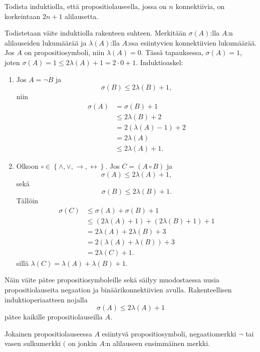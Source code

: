 \documentclass[12pt,a4paper]{article}
\begin{document}
\begin{exercise}
Todista induktiolla, että propositiolauseella, jossa on \(n\) konnektiivia,
on korkeintaan \(2n + 1\) alilausetta.
\end{exercise}

\begin{solution}
Todistetaan väite induktiolla rakenteen suhteen. Merkitään \(\sigma(A)\):lla
\(A\):n alilauseiden lukumäärää ja \(\lambda(A)\):lla \(A\):ssa esiintyvien
konnektiivien lukumäärää. Jos \(A\) on propositiosymboli, niin
\(\lambda(A) = 0\). Tässä tapauksessa, \(\sigma(A) = 1\), joten
\(\sigma(A) = 1 \leq 2\lambda(A) + 1 = 2\cdot 0 + 1\). Induktioaskel:
\begin{enumerate}[label=\alph*), nosep]
\item Jos \(A = \neg B\) ja
\[\sigma(B) \leq 2\lambda(B) + 1,\]
niin
\[
\begin{aligned}
\sigma(A) &= \sigma(B) + 1 \\
&\leq 2\lambda(B) + 2 \\
&= 2(\lambda(A) - 1) + 2 \\
&= 2\lambda(A) \\
&\leq 2\lambda(A) + 1.
\end{aligned}
\]
\item Olkoon \(\circ \in \left\{\land, \lor, \rightarrow,
\leftrightarrow \right\}\).
Jos \(C = (A \circ B)\) ja
\[\sigma(A) \leq 2\lambda(A) + 1,\]
sekä
\[\sigma(B) \leq 2\lambda(B) + 1.\]
Tällöin
\[
\begin{aligned}
\sigma(C) &\leq \sigma(A) + \sigma(B) + 1 \\
&\leq (2\lambda(A) + 1) + (2\lambda(B) + 1) + 1 \\
&= 2\lambda(A) + 2\lambda(B) + 3 \\
&= 2(\lambda(A) + \lambda(B)) + 3 \\
&= 2\lambda(C) + 1.
\end{aligned}
\]
sillä \(\lambda(C) = \lambda(A) + \lambda(B) + 1\).
\end{enumerate}
Näin väite pätee propositiosymboleille sekä säilyy muodostaessa
uusia propositiolauseita negaation ja binäärikonnektiivien avulla.
Rakenteellisen induktioperiaatteen nojalla
\[\sigma(A) \leq 2\lambda(A) + 1\]
pätee kaikille propositiolauseilla \(A\).
\end{solution}

\begin{lemma}\label{lem:subformula}
Jokainen propositiolauseessa \(A\) esiintyvä propositiosymboli,
negaatiomerkki \(\neg\) tai vasen sulkumerkki \((\) on jonkin
\(A\):n alilauseen ensimmäinen merkki.
\end{lemma}
\end{document}
